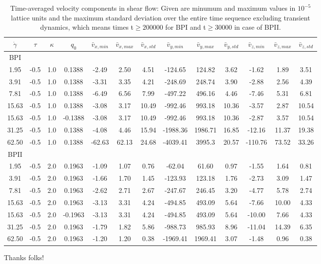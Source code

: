 \documentclass[aps,pre,reprint,superscriptaddress]{revtex4}
\begin{document}
\appendix*

\begin{table}
\begin{tabular}{|c|| c | c| c || c |c |c||c| c| c||c| c| c|}
\hline
$\dot{\gamma}$ & $\tau$ & $\kappa$ & $q_0$ & $\bar{v}_{x,min}$ & $\bar{v}_{x,max}$ & $\bar{v}_{x,std}$ & $\bar{v}_{y,min}$ & $\bar{v}_{y,max}$ & $\bar{v}_{y,std}$ & $\bar{v}_{z,min}$ & $\bar{v}_{z,max}$ & $\bar{v}_{z,std}$ \\
\hline
BPI \\
\hline
1.95 & -0.5 & 1.0 &0.1388 & -2.49 &2.50 &4.51 &-124.65 &124.82 &3.62 &-1.62 &1.89 &3.51 \\
3.91 & -0.5 & 1.0 &0.1388 & -3.31 &3.35 &4.21 &-248.69 &248.74 &3.90 &-2.88 &2.56 &4.39 \\
7.81 & -0.5 & 1.0 &0.1388 &-6.49 &6.56 &7.99 &-497.22 &496.16 &4.46 &-7.46 &5.31 &6.81 \\ 
15.63 & -0.5 & 1.0 &0.1388 &-3.08 &3.17 &10.49 &-992.46 &993.18 &10.36 &-3.57 &2.87 &10.54 \\
15.63 & -0.5 & 1.0 &-0.1388 &-3.08 &3.17 &10.49 &-992.46 &993.18 &10.36 &-2.87 &3.57 &10.54 \\
31.25 & -0.5 & 1.0 &0.1388 &-4.08 &4.46 &15.94 & -1988.36 &1986.71 &16.85 &-12.16 &11.37 &19.38\\
62.50 & -0.5 & 1.0 &0.1388 & -62.63 & 62.13 & 24.68 & -4039.41 &3995.3  & 20.57 &-110.76  &73.52 & 33.26 \\
\hline
BPII \\
\hline
1.95 & -0.5 & 2.0 & 0.1963 & -1.09 &1.07 & 0.76 &  -62.04  &61.60 & 0.97 & -1.55 &1.64 & 0.81\\
3.91 & -0.5 & 2.0 & 0.1963&-1.66 &1.70 & 1.45 &-123.93 &123.18 & 1.76 &-2.73 &3.09 &1.47\\
7.81 &  -0.5 & 2.0 &0.1963& -2.62 &2.71 & 2.67 &-247.67 &246.45 & 3.20 &-4.77 &5.78 &2.74\\
15.63 & -0.5 & 2.0 & 0.1963&-3.13 &3.31 &4.24 &-494.85 &493.09 & 5.64 &-7.66 &10.00 &4.33\\
15.63 & -0.5 & 2.0 &-0.1963& -3.13 &3.31 &4.24 &-494.85 &493.09 & 5.64 &-10.00 &7.66 &4.33\\
31.25 & -0.5 & 2.0 &0.1963 &-1.79 &1.82 &5.86 &-988.73 &985.93 &8.96  &-11.04 &14.39 &6.35\\
62.50 & -0.5 & 2.0 &0.1963 & -1.20 & 1.20 & 0.38 & -1969.41  & 1969.41 & 3.07 &-1.48 &0.96 &0.38 \\
\hline
\end{tabular}
\caption{Time-averaged velocity components in shear flow: Given are minumum and maximum values in $10^{-5}$ lattice units and the maximum standard deviation over the entire time sequence excluding transient dynamics, which means times t$\ge 200000$ for BPI and t$\ge 30000$ in case of BPII.
\label{tab1}}
\end{table}

\begin{acknowledgments}
Thanks folks!
\end{acknowledgments}


\end{document}
